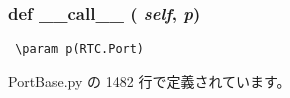 \subsubsection{\setlength{\rightskip}{0pt plus 5cm}def \_\-\_\-call\_\-\_\- ( {\em self},  {\em p})}\label{classsource__py_1_1_port_base_1_1_port_base_1_1disconnect__func_e844e0019d38360a86bac1474132db3c}




\footnotesize\begin{verbatim}
 \param p(RTC.Port)
\end{verbatim}
\normalsize
 

 PortBase.py の 1482 行で定義されています。